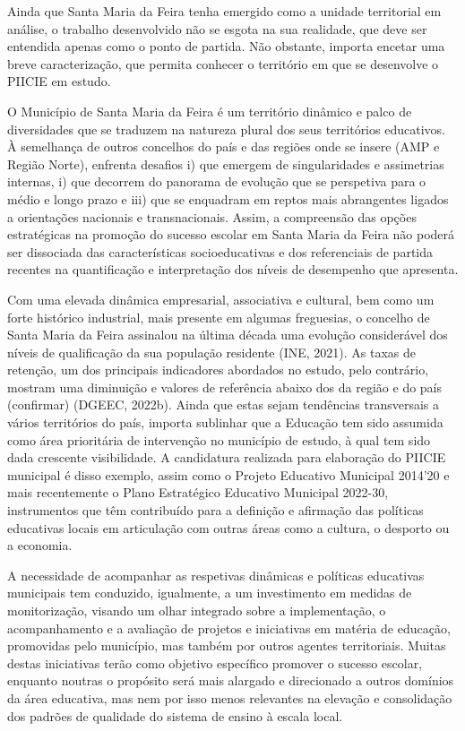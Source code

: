 \documentclass[
]{book}
\begin{document}
Ainda que Santa Maria da Feira tenha emergido como a unidade territorial em análise, o trabalho desenvolvido não se esgota na sua realidade, que deve ser entendida apenas como o ponto de partida. Não obstante, importa encetar uma breve caracterização, que permita conhecer o território em que se desenvolve o PIICIE em estudo.

O Município de Santa Maria da Feira é um território dinâmico e palco de diversidades que se traduzem na natureza plural dos seus territórios educativos. À semelhança de outros concelhos do país e das regiões onde se insere (AMP e Região Norte), enfrenta desafios i) que emergem de singularidades e assimetrias internas, i) que decorrem do panorama de evolução que se perspetiva para o médio e longo prazo e iii) que se enquadram em reptos mais abrangentes ligados a orientações nacionais e transnacionais. Assim, a compreensão das opções estratégicas na promoção do sucesso escolar em Santa Maria da Feira não poderá ser dissociada das características socioeducativas e dos referenciais de partida recentes na quantificação e interpretação dos níveis de desempenho que apresenta.

Com uma elevada dinâmica empresarial, associativa e cultural, bem como um forte histórico industrial, mais presente em algumas freguesias, o concelho de Santa Maria da Feira assinalou na última década uma evolução considerável dos níveis de qualificação da sua população residente (INE, 2021). As taxas de retenção, um dos principais indicadores abordados no estudo, pelo contrário, mostram uma diminuição e valores de referência abaixo dos da região e do país (confirmar) (DGEEC, 2022b). Ainda que estas sejam tendências transversais a vários territórios do país, importa sublinhar que a Educação tem sido assumida como área prioritária de intervenção no município de estudo, à qual tem sido dada crescente visibilidade. A candidatura realizada para elaboração do PIICIE municipal é disso exemplo, assim como o Projeto Educativo Municipal 2014'20 e mais recentemente o Plano Estratégico Educativo Municipal 2022-30, instrumentos que têm contribuído para a definição e afirmação das políticas educativas locais em articulação com outras áreas como a cultura, o desporto ou a economia.

A necessidade de acompanhar as respetivas dinâmicas e políticas educativas municipais tem conduzido, igualmente, a um investimento em medidas de monitorização, visando um olhar integrado sobre a implementação, o acompanhamento e a avaliação de projetos e iniciativas em matéria de educação, promovidas pelo município, mas também por outros agentes territoriais. Muitas destas iniciativas terão como objetivo específico promover o sucesso escolar, enquanto noutras o propósito será mais alargado e direcionado a outros domínios da área educativa, mas nem por isso menos relevantes na elevação e consolidação dos padrões de qualidade do sistema de ensino à escala local.
\end{document}
